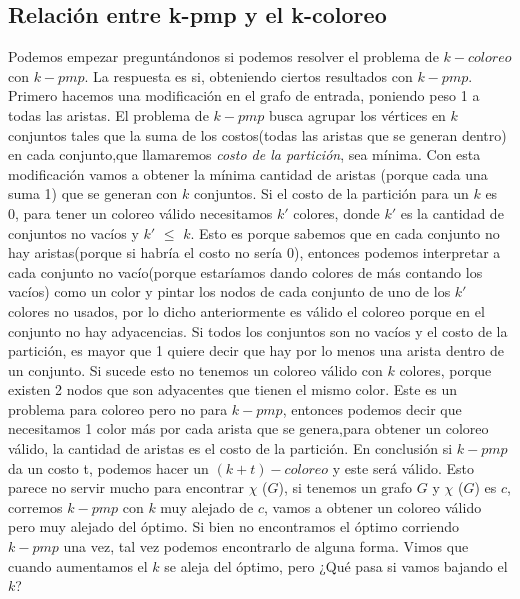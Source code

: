\documentclass[a4paper]{article}
\begin{document}
\subsection{Relación entre k-pmp y el k-coloreo}
Podemos empezar preguntándonos si podemos resolver el problema de $k-coloreo$ con $k-pmp$. La respuesta es si, obteniendo ciertos resultados con $k-pmp$.\newline
Primero hacemos una modificación en el grafo de entrada, poniendo peso 1 a todas las aristas. El problema de   $k-pmp$ busca agrupar los vértices en $k$ conjuntos tales que la suma de los costos(todas las aristas que se generan dentro) en cada conjunto,que llamaremos \textit{costo de la partición}, sea mínima. Con esta modificación vamos a obtener la mínima cantidad de aristas (porque cada una suma 1) que se generan con $k$ conjuntos.\newline
Si el costo de la partición para un $k$ es 0, para tener un coloreo válido necesitamos $k'$ colores, donde $k'$ es la cantidad de conjuntos no vacíos y $k'$ $\leq$ $k$. Esto es porque sabemos que en cada conjunto no hay aristas(porque si habría el costo no sería 0), entonces podemos interpretar a cada conjunto no vacío(porque estaríamos dando colores de más contando los vacíos) como un color y pintar los nodos de cada conjunto de uno de los $k'$ colores no usados, por lo dicho anteriormente es válido el coloreo porque en el conjunto no hay adyacencias. \newline
Si todos los conjuntos son no vacíos y el costo de la partición, es mayor que 1 quiere decir que hay por lo menos una arista dentro de un conjunto. Si sucede esto no tenemos un coloreo válido con $k$ colores, porque existen 2 nodos que son adyacentes que tienen el mismo color.
Este es un problema para coloreo pero no para $k-pmp$, entonces podemos decir que necesitamos 1 color más por cada arista que se genera,para obtener un coloreo válido, la cantidad de aristas es el costo de la partición.\newline
En conclusión si $k-pmp$ da un costo t, podemos hacer un $(k+t)-coloreo$ y este será válido. Esto parece no servir mucho para encontrar $\chi$ ($G$), si tenemos un grafo $G$ y $\chi$ ($G$) es $c$, corremos $k-pmp$ con $k$ muy alejado de $c$, vamos a obtener un coloreo válido pero muy alejado del óptimo.\newline
Si bien no encontramos el óptimo corriendo $k-pmp$ una vez, tal vez podemos encontrarlo de alguna forma. Vimos que cuando aumentamos el $k$ se aleja del óptimo, pero ¿Qué pasa si vamos bajando el $k$? \newline
\end{document}
